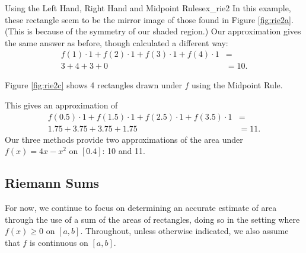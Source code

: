 \begin{example}{Using the Left Hand, Right Hand and Midpoint Rules}{ex_rie2}
\noindent In this example, these rectangle seem to be the mirror image of those found in Figure \ref{fig:rie2a}. (This is because of the symmetry of our shaded region.) Our approximation gives the same answer as before, though calculated a different way:
	\begin{align*} f(1)\cdot 1 + f(2)\cdot 1+ f(3)\cdot 1+f(4)\cdot 1 &=\\
	3+4+3+0&= 10.
	\end{align*}

Figure \ref{fig:rie2c} shows 4 rectangles drawn under $f$ using the Midpoint Rule.

\begin{minipage}[t]{\linewidth}
\caption{Approximating the area under $f(x)= 4x-x^2$ on $ [0,4] $ using the Midpoint Rule \label{fig:rie2c}}
\end{minipage}

\noindent This gives an approximation of 
\begin{align*} f(0.5)\cdot 1 + f(1.5)\cdot 1+ f(2.5)\cdot 1+f(3.5)\cdot 1 &=\\
	1.75+3.75+3.75+1.75&= 11.
	\end{align*}
Our three methods provide two approximations of the area under $f(x)=4x-x^2 $ on $ [0.4] $: 10 and 11.
\end{example}










\subsection{Riemann Sums}


For now, we continue to focus on determining an accurate estimate of area through the use of a sum of the areas of rectangles, doing so in the setting where $f(x) \ge 0$ on $[a,b]$.  Throughout, unless otherwise indicated, we also assume that $f$ is continuous on $[a,b]$.

